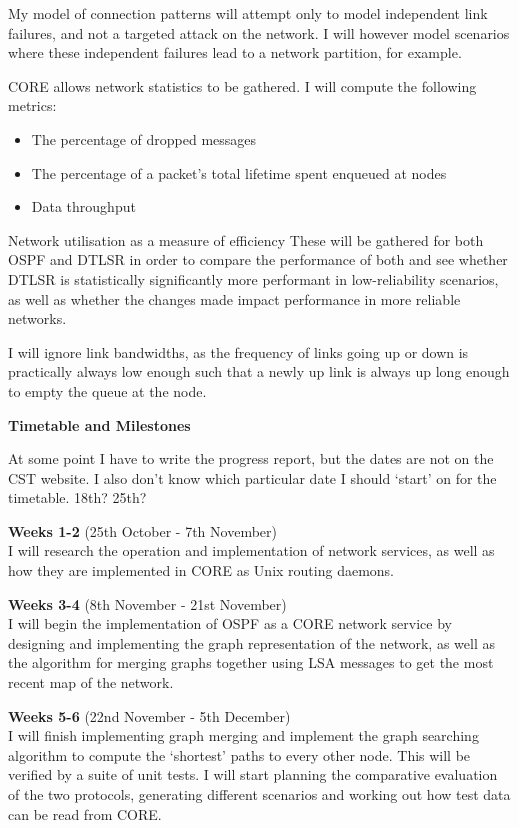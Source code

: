 \documentclass[withindex,glossary,openany]{cam-thesis}
\begin{document}
My model of connection patterns will attempt only to model independent link failures, and not a targeted attack on the network. I will however model scenarios where these independent failures lead to a network partition, for example.

CORE allows network statistics to be gathered. I will compute the following metrics:

\begin{itemize}
\item
The percentage of dropped messages

\item
The percentage of a packet’s total lifetime spent enqueued at nodes

\item
Data throughput
\end{itemize}

Network utilisation as a measure of efficiency
These will be gathered for both OSPF and DTLSR in order to compare the performance of both and see whether DTLSR is statistically significantly more performant in low-reliability scenarios, as well as whether the changes made impact performance in more reliable networks.

I will ignore link bandwidths, as the frequency of links going up or down is practically always low enough such that a newly up link is always up long enough to empty the queue at the node.

\vspace{8mm}
\LARGE\textbf{Timetable and Milestones}\normalsize

At some point I have to write the progress report, but the dates are not on the CST website. I also don’t know which particular date I should `start’ on for the timetable. 18th? 25th?

\large\textbf{Weeks 1-2} (25th October - 7th November)\normalsize\\
I will research the operation and implementation of network services, as well as how they are implemented in CORE as Unix routing daemons.

\large\textbf{Weeks 3-4} (8th November - 21st November)\normalsize\\
I will begin the implementation of OSPF as a CORE network service by designing and implementing the graph representation of the network, as well as the algorithm for merging graphs together using LSA messages to get the most recent map of the network.

\large\textbf{Weeks 5-6} (22nd November - 5th December)\normalsize\\
I will finish implementing graph merging and implement the graph searching algorithm to compute the `shortest’ paths to every other node. This will be verified by a suite of unit tests. I will start planning the comparative evaluation of the two protocols, generating different scenarios and working out how test data can be read from CORE.
\end{document}
